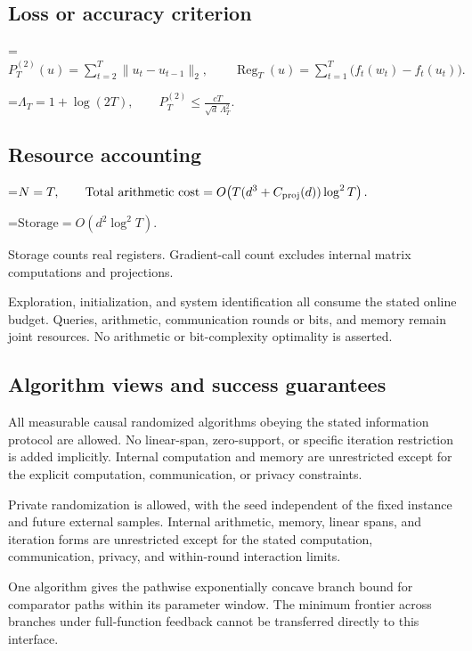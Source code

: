 \documentclass[10pt,a4paper]{article}
\newcommand{\AtlasMath}[1]{\par\begingroup\centering\setbox0=\hbox{$\displaystyle #1$}\ifdim\wd0>1.4\linewidth\typeout{ATLAS WIDE FORMULA: \the\wd0}\fi\ifdim\wd0>\linewidth\resizebox{\linewidth}{!}{\box0}\else\box0\fi\par\endgroup}
\begin{document}
\subsection{Loss or accuracy criterion}

\AtlasMath{P_T^{(2)}(u)=\sum_{t=2}^{T}\|u_t-u_{t-1}\|_2,\qquad \operatorname{Reg}_T(u)=\sum_{t=1}^{T}\bigl(f_t(w_t)-f_t(u_t)\bigr).}



\AtlasMath{\Lambda_T=1+\log(2T),\qquad P_T^{(2)}\le \frac{cT}{\sqrt d\,\Lambda_T^2}.}


\subsection{Resource accounting}

\AtlasMath{N=T,\qquad\text{Total arithmetic cost}=O\!\left(T(d^3+C_{\rm proj}(d))\log^2T\right).}



\AtlasMath{\text{Storage}=O(d^2\log^2T).}


Storage counts real registers. Gradient-call count excludes internal matrix computations and projections.

Exploration, initialization, and system identification all consume the stated online budget. Queries, arithmetic, communication rounds or bits, and memory remain joint resources. No arithmetic or bit-complexity optimality is asserted.

\subsection{Algorithm views and success guarantees}
All measurable causal randomized algorithms obeying the stated information protocol are allowed. No linear-span, zero-support, or specific iteration restriction is added implicitly. Internal computation and memory are unrestricted except for the explicit computation, communication, or privacy constraints.

Private randomization is allowed, with the seed independent of the fixed instance and future external samples. Internal arithmetic, memory, linear spans, and iteration forms are unrestricted except for the stated computation, communication, privacy, and within-round interaction limits.

One algorithm gives the pathwise exponentially concave branch bound for comparator paths within its parameter window. The minimum frontier across branches under full-function feedback cannot be transferred directly to this interface.
\end{document}
